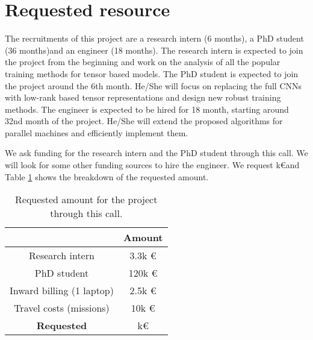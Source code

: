 \documentclass[11pt]{article}
\begin{document}
\section{Requested resource}
The recruitments of this project are a research intern (6 months), a PhD student  (36 months)and an engineer (18 months). The  research intern is expected to join the project from the beginning and work on the analysis of all the popular training methods for tensor based models. The PhD student is expected to join the project around the 6th month. He/She will focus on replacing the full CNNs  with low-rank based tensor representations and design new robust training methods. The engineer is expected to be hired for 18 month, starting around 32nd month of the project. He/She will extend the proposed algorithms for parallel machines and efficiently implement them. 


We ask funding for the research intern and the PhD student through this call. We will look for some other funding sources to hire the engineer.  We request k\euro and Table \ref{tab:reqcost} shows the breakdown of the requested amount.

\begin{table}
	\begin{center}
\begin{tabular}{|c|c|}
\hline
& Amount\\ \hline
Research intern & 3.3k \euro \\ \hline
PhD student & 120k \euro \\ \hline
Inward billing (1 laptop) & 2.5k \euro \\ \hline
Travel costs (missions) & 10k \euro \\ \hline
\textbf{Requested} & k\euro\\ \hline
\end{tabular}
	\caption{Requested amount for the project through this call.\label{tab:reqcost}}
\end{center}
\end{table}





\end{document}
